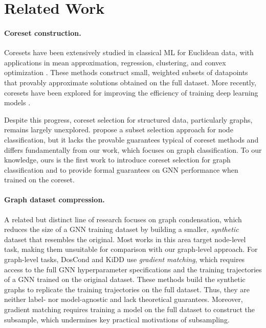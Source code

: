 \section{Related Work}
\label{sec:related-work}

\paragraph{Coreset construction.}
Coresets have been extensively studied in classical ML for Euclidean data, with applications in mean approximation, regression, clustering, and convex optimization \citep{bachem_practical_2017, mirzasoleiman2020coresets, woodruff_coresets_2024, cohen-addad_improved_2022, tukan_coresets_2020}. These methods construct small, weighted subsets of datapoints that provably approximate solutions obtained on the full dataset. More recently, coresets have been explored for improving the efficiency of training deep learning models \citep{yang_towards_2023, ding_spectral_2024, mirzasoleiman2020coresets}.  

Despite this progress, coreset selection for structured data, particularly graphs, remains largely unexplored. \citet{ding_spectral_2024} propose a subset selection approach for node classification, but it lacks the provable guarantees typical of coreset methods and differs fundamentally from our work, which focuses on graph classification. To our knowledge, ours is the first work to introduce coreset selection for graph classification and to provide formal guarantees on GNN performance when trained on the coreset.


\paragraph{Graph dataset compression.}{ A related but distinct line of research focuses on graph condensation, which reduces the size of a GNN training dataset by building a smaller, \emph{synthetic} dataset that resembles the original. Most works in this area target node-level task, making them unsuitable for comparison with our graph-level approach. For graph-level tasks, DosCond \citep{jin2022condensing} and KiDD \citep{kidd} use \emph{gradient matching}, which requires access to the full GNN hyperparameter specifications and the training trajectories of a GNN trained on the original dataset. These methods build the synthetic graphs to replicate the training trajectories on the full dataset. Thus, they are neither label- nor model-agnostic and lack theoretical guarantees. Moreover, gradient matching requires training a model on the full dataset to construct the subsample, which undermines key practical motivations of subsampling.
}

